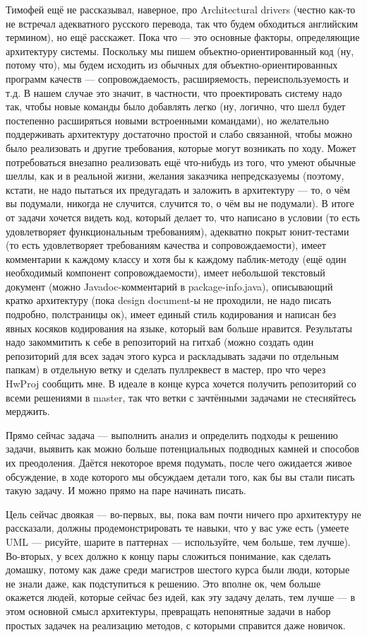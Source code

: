 \documentclass[a5paper]{article}
\begin{document}
Тимофей ещё не рассказывал, наверное, про Architectural drivers (честно как-то не встречал адекватного русского перевода, так что будем обходиться английским термином), но ещё расскажет. Пока что --- это основные факторы, определяющие архитектуру системы. Поскольку мы пишем объектно-ориентированный код (ну, потому что), мы будем исходить из обычных для объектно-ориентированных программ качеств --- сопровождаемость, расширяемость, переиспользуемость и т.д. В нашем случае это значит, в частности, что проектировать систему надо так, чтобы новые команды было добавлять легко (ну, логично, что шелл будет постепенно расширяться новыми встроенными командами), но желательно поддерживать архитектуру достаточно простой и слабо связанной, чтобы можно было реализовать и другие требования, которые могут возникать по ходу. Может потребоваться внезапно реализовать ещё что-нибудь из того, что умеют обычные шеллы, как и в реальной жизни, желания заказчика непредсказуемы (поэтому, кстати, не надо пытаться их предугадать и заложить в архитектуру --- то, о чём вы подумали, никогда не случится, случится то, о чём вы не подумали). В итоге от задачи хочется видеть код, который делает то, что написано в условии (то есть удовлетворяет функциональным требованиям), адекватно покрыт юнит-тестами (то есть удовлетворяет требованиям качества и сопровождаемости), имеет комментарии к каждому классу и хотя бы к каждому паблик-методу (ещё один необходимый компонент сопровождаемости), имеет небольшой текстовый документ (можно Javadoc-комментарий в package-info.java), описывающий кратко архитектуру (пока design document-ы не проходили, не надо писать подробно, полстраницы ок), имеет единый стиль кодирования и написан без явных косяков кодирования на языке, который вам больше нравится. Результаты надо закоммитить к себе в репозиторий на гитхаб (можно создать один репозиторий для всех задач этого курса и раскладывать задачи по отдельным папкам) в отдельную ветку и сделать пуллреквест в мастер, про что через HwProj сообщить мне. В идеале в конце курса хочется получить репозиторий со всеми решениями в master, так что ветки с зачтёнными задачами не стесняйтесь мерджить.

Прямо сейчас задача --- выполнить анализ и определить подходы к решению задачи, выявить как можно больше потенциальных подводных камней и способов их преодоления. Даётся некоторое время подумать, после чего ожидается живое обсуждение, в ходе которого мы обсуждаем детали того, как бы вы стали писать такую задачу. И можно прямо на паре начинать писать.

Цель сейчас двоякая --- во-первых, вы, пока вам почти ничего про архитектуру не рассказали, должны продемонстрировать те навыки, что у вас уже есть (умеете UML --- рисуйте, шарите в паттернах --- используйте, чем больше, тем лучше). Во-вторых, у всех должно к концу пары сложиться понимание, как сделать домашку, потому как даже среди магистров шестого курса были люди, которые не знали даже, как подступиться к решению. Это вполне ок, чем больше окажется людей, которые сейчас без идей, как эту задачу делать, тем лучше --- в этом основной смысл архитектуры, превращать непонятные задачи в набор простых задачек на реализацию методов, с которыми справится даже новичок.
\end{document}
